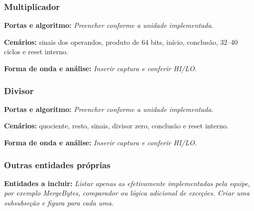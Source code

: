 \subsubsection{Multiplicador}\label{sim-ent:mult}
\noindent\textbf{Portas e algoritmo:} \textit{Preencher conforme a unidade implementada.}\par
\noindent\textbf{Cenários:} sinais dos operandos, produto de 64 bits, início, conclusão, 32--40 ciclos e reset interno.\par
\noindent\textbf{Forma de onda e análise:} \textit{Inserir captura e conferir HI/LO.}\par

\subsubsection{Divisor}\label{sim-ent:div}
\noindent\textbf{Portas e algoritmo:} \textit{Preencher conforme a unidade implementada.}\par
\noindent\textbf{Cenários:} quociente, resto, sinais, divisor zero, conclusão e reset interno.\par
\noindent\textbf{Forma de onda e análise:} \textit{Inserir captura e conferir HI/LO.}\par

\subsubsection{Outras entidades próprias}\label{sim-ent:outras}
\noindent\textbf{Entidades a incluir:} \textit{Listar apenas as efetivamente implementadas pela equipe, por exemplo MergeBytes, comparador ou lógica adicional de exceções. Criar uma subsubseção e figura para cada uma.}\par
